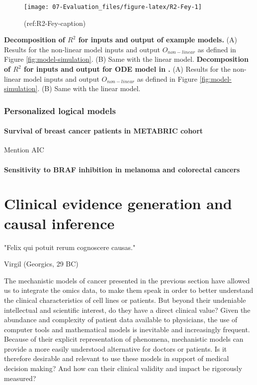 \documentclass[a4paper,12pt,twoside,onecolumn,openright,final,oldfontcommands]{memoir}
\newcommand{\initial}[1]{
	\lettrine[lines=3,lhang=0.33,nindent=0em]{
		\color{gray}
     		{\textsc{#1}}}{}}
\begin{document}
\begin{figure}

{\centering \texttt{[image: 07-Evaluation\_files/figure-latex/R2-Fey-1]} 

}

\caption[Decomposition of $R^2$ for inputs and output for ODE model in @fey2015signaling]{(ref:R2-Fey-caption)}\label{fig:R2-Fey}
\end{figure}

\textbf{Decomposition of \(R^2\) for inputs
and output of example models.} (A) Results for the non-linear model
inputs and output \(O_{non-linear}\) as defined in Figure
\ref{fig:model-simulation}. (B) Same with the linear model. \textbf{Decomposition of \(R^2\) for inputs
and output for ODE model in \citet{fey2015signaling}.} (A) Results for
the non-linear model inputs and output \(O_{non-linear}\) as defined in
Figure \ref{fig:model-simulation}. (B) Same with the linear model.

\subsection{Personalized logical
models}\label{personalized-logical-models}

\subsubsection{Survival of breast cancer patients in METABRIC
cohort}\label{survival-of-breast-cancer-patients-in-metabric-cohort}

Mention AIC

\citep{kirk2013model}

\subsubsection{Sensitivity to BRAF inhibition in melanoma and colorectal
cancers}\label{sensitivity-to-braf-inhibition-in-melanoma-and-colorectal-cancers}

\chapter{Clinical evidence generation and causal
inference}\label{clinical-evidence-generation-and-causal-inference}

\epigraph{"Felix qui potuit rerum cognoscere causas."}{Virgil (Georgics, 29 BC)}

\initial{T}he mechanistic models of cancer presented in the previous
section have allowed us to integrate the omics data, to make them speak
in order to better understand the clinical characteristics of cell lines
or patients. But beyond their undeniable intellectual and scientific
interest, do they have a direct clinical value? Given the abundance and
complexity of patient data available to physicians, the use of computer
tools and mathematical models is inevitable and increasingly frequent.
Because of their explicit representation of phenomena, mechanistic
models can provide a more easily understood alternative for doctors or
patients. Is it therefore desirable and relevant to use these models in
support of medical decision making? And how can their clinical validity
and impact be rigorously measured?
\end{document}
